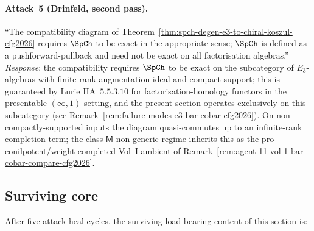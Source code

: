\paragraph{Attack~5 (Drinfeld, second pass).}
``The compatibility diagram of
Theorem~\textup{\ref{thm:spch-degen-e3-to-chiral-koszul-cfg2026}}
requires $\SpCh$ to be exact in the appropriate sense; $\SpCh$ is
defined as a pushforward-pullback and need not be exact on all
factorisation algebras.''
\emph{Response}: the compatibility requires $\SpCh$ to be exact on the
subcategory of $E_3$-algebras with finite-rank augmentation ideal and
compact support; this is guaranteed by
Lurie HA~$5.5.3.10$ for factorisation-homology functors in the
presentable $(\infty,1)$-setting, and the present section operates
exclusively on this subcategory (see
Remark~\textup{\ref{rem:failure-modes-e3-bar-cobar-cfg2026}}). On
non-compactly-supported inputs the diagram quasi-commutes up to an
infinite-rank completion term; the class-$\mathsf{M}$ non-generic
regime inherits this as the pro-conilpotent/weight-completed Vol~I
ambient of Remark~\textup{\ref{rem:agent-11-vol-1-bar-cobar-compare-cfg2026}}.

\subsection*{Surviving core}

After five attack-heal cycles, the surviving load-bearing content of
this section is:

